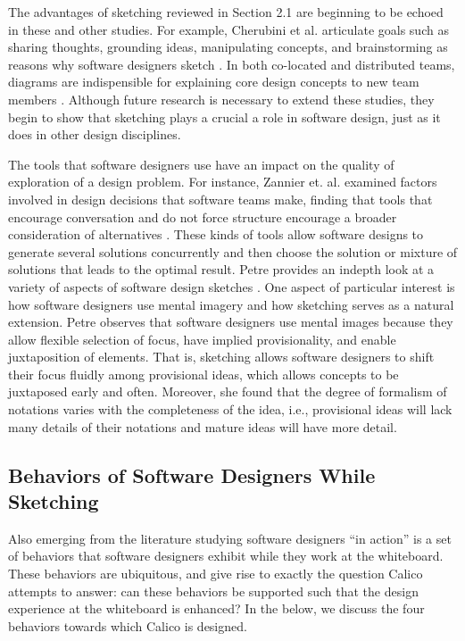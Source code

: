 The advantages of sketching reviewed in Section 2.1 are beginning to be echoed in these and other studies. For example, Cherubini et al. articulate goals such as sharing thoughts, grounding ideas, manipulating concepts, and brainstorming as reasons why software designers sketch \citep{cherubini2007let}. In both co-located and distributed teams, diagrams are indispensible for explaining core design concepts to new team members \citep{Yatani}. Although future research is necessary to extend these studies, they begin to show that sketching plays a crucial a role in software design, just as it does in other design disciplines.

The tools that software designers use have an impact on the quality of exploration of a design problem. For instance, Zannier et. al. examined factors involved in design decisions that software teams make, finding that tools that encourage conversation and do not force structure encourage a broader consideration of alternatives \citep{zannier2007comparing}. These kinds of tools allow software designs to generate several solutions concurrently and then choose the solution or mixture of solutions that leads to the optimal result. 
Petre provides an indepth look at a variety of aspects of software design sketches \citep{petre2009insights}. One aspect of particular interest is how software designers use mental imagery and how sketching serves as a natural extension. Petre observes that software designers use mental images because they allow flexible selection of focus, have implied provisionality, and enable juxtaposition of elements. That is, sketching allows software designers to shift their focus fluidly among provisional ideas, which allows concepts to be juxtaposed early and often. Moreover, she found that the degree of formalism of notations varies with the completeness of the idea, i.e., provisional ideas will lack many details of their notations and mature ideas will have more detail.

\subsection{Behaviors of Software Designers While Sketching}
\label{behaviorsofsoftwaredesignerswhilesketching}
Also emerging from the literature studying software designers ``in action'' is a set of behaviors that software designers exhibit while they work at the whiteboard. These behaviors are ubiquitous, and give rise to exactly the question Calico attempts to answer: can these behaviors be supported such that the design experience at the whiteboard is enhanced? In the below, we discuss the four behaviors towards which Calico is designed.

